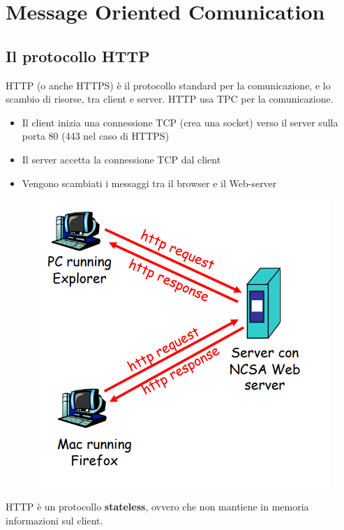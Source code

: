 \documentclass[12pt, a4paper]{article}
\begin{document}
    \section{Message Oriented Comunication}
    \subsection{Il protocollo HTTP}
    HTTP (o anche HTTPS) è il protocollo standard per la comunicazione, e lo scambio di risorse,
    tra client e server. HTTP usa TPC per la comunicazione.
    \begin{itemize}
        \item Il client inizia una connessione TCP (crea una socket) verso il server sulla porta 80 (443 nel caso di HTTPS)
        \item Il server accetta la connessione TCP dal client
        \item Vengono scambiati i messaggi tra il browser e il Web-server
    \end{itemize}

    \begin{figure}[htbp]
        \centering
        \includegraphics[scale=0.5]{http.png}
    \end{figure}
    
    HTTP è un protocollo \textbf{stateless}, ovvero che non mantiene in memoria informazioni sul client.
    
\end{document}
